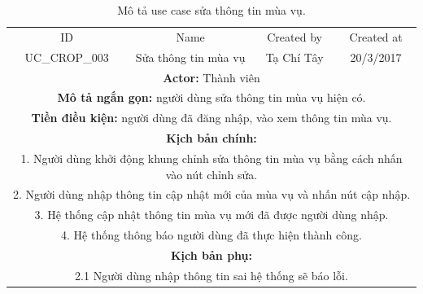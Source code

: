 \documentclass[a4paper,12pt,oneside]{article}
\begin{document}
\begin{table}[!htp]
\centering
\begin{tabularx}{\linewidth}{ |c||c|c|c| }
\hline
ID & Name & Created by & Created at\\
UC\_CROP\_003 & Sửa thông tin mùa vụ & Tạ Chí Tây & 20/3/2017\\
\hline
\multicolumn{4}{|X|}{\textbf{Actor:} Thành viên }\\
\hline
\multicolumn{4}{|X|}{\textbf{Mô tả ngắn gọn:} người dùng sửa thông tin mùa vụ hiện có. }\\
\hline
\multicolumn{4}{|X|}{\textbf{Tiền điều kiện:} người dùng đã đăng nhập, vào xem thông tin mùa vụ.}\\
\hline
\multicolumn{4}{|X|}{\textbf{Kịch bản chính:}}\\
\multicolumn{4}{|X|}{ 1.	Người dùng khởi động khung chỉnh sửa thông tin mùa vụ bằng cách nhấn vào nút chỉnh sửa.}\\
\multicolumn{4}{|X|}{
2.	Người dùng nhập thông tin cập nhật mới của mùa vụ và nhấn nút cập nhập.}\\
\multicolumn{4}{|X|}{
3.	Hệ thống cập nhật thông tin mùa vụ mới đã được người dùng nhập.}\\
\multicolumn{4}{|X|}{4. Hệ thống thông báo người dùng đã thực hiện thành công.}\\
\hline
\multicolumn{4}{|X|}{\textbf{Kịch bản phụ:}}\\
\multicolumn{4}{|X|}{2.1    Người dùng nhập thông tin sai hệ thống sẽ báo lỗi.}\\
\hline

\end{tabularx}
\caption{Mô tả use case sửa thông tin mùa vụ.}
\end{table}
\end{document}
